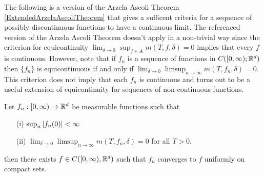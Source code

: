 The following is a version of the Arzela Ascoli Theorem \ref{ExtendedArzelaAscoliTheorem} that gives a
sufficent criteria for a sequence of possibly discontinuous functions
to have a continuous limit.  The referenced version of the Arzela Ascoli Theorem
doesn't apply in a non-trivial way since the criterion for
equicontinuity $\lim_{\delta \to 0} \sup_{f \in A} m(T, f, \delta) = 0$ implies that every $f$ is continuous.  However, note that if $f_n$ is a sequence of
functions in $C([0,\infty); \mathbb{R}^d)$ then $\lbrace f_n \rbrace$ is equicontinuous if
and only if $\lim_{\delta \to 0} \limsup_{n \to \infty} m(T, f_n,
\delta) = 0$.  This criterion does not imply that each $f_n$ is
continuous and turns out to be a useful extension of equicontinuity
for sequences of non-continuous functions.
\begin{thm}\label{ExtendedArzelaAscoliTheorem}Let $f_n : [0,\infty) \to
 \mathbb{R}^d$ be measurable functions such that  
\begin{itemize}
\item[(i)]$\sup_{n} \left \vert f_n(0) \right \vert < \infty$
\item[(ii)] $\lim_{\delta \to 0} \limsup_{n \to \infty} m(T, f_n,
  \delta) = 0$ for all $T > 0$.
\end{itemize}
then there exists $f \in C([0,\infty), \mathbb{R}^d)$ such that $f_n$
converges to $f$ uniformly on compact sets.
\end{thm}
